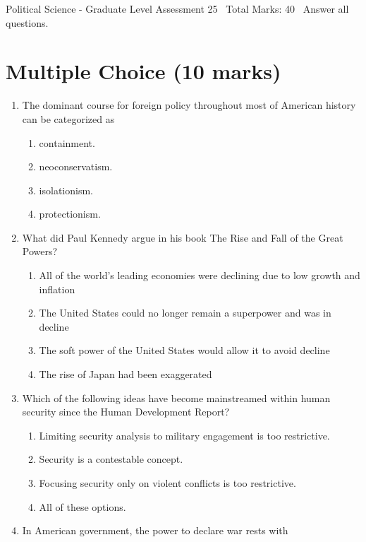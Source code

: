\documentclass[12pt]{article}
\begin{document}
\begin{center}
Political Science - Graduate Level Assessment 25 \
Total Marks: 40 \
Answer all questions.
\end{center}

\section*{Multiple Choice (10 marks)}
\begin{enumerate}[label=\arabic*.]
\item The dominant course for foreign policy throughout most of American history can be categorized as
\begin{enumerate}[label=(\alph*)]
    \item containment.
    \item neoconservatism.
    \item isolationism.
    \item protectionism.
\end{enumerate}
\item What did Paul Kennedy argue in his book The Rise and Fall of the Great Powers?
\begin{enumerate}[label=(\alph*)]
    \item All of the world's leading economies were declining due to low growth and inflation
    \item The United States could no longer remain a superpower and was in decline
    \item The soft power of the United States would allow it to avoid decline
    \item The rise of Japan had been exaggerated
\end{enumerate}
\item Which of the following ideas have become mainstreamed within human security since the Human Development Report?
\begin{enumerate}[label=(\alph*)]
    \item Limiting security analysis to military engagement is too restrictive.
    \item Security is a contestable concept.
    \item Focusing security only on violent conflicts is too restrictive.
    \item All of these options.
\end{enumerate}
\item In American government, the power to declare war rests with
\begin{enumerate}[label=(\alph*)]

\end{enumerate}
\end{enumerate}
\end{document}
